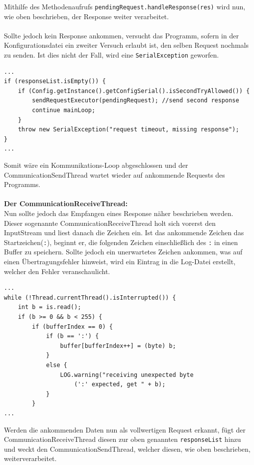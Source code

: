 Mithilfe des Methodenaufrufs \lstinline[style=java]{pendingRequest.handleResponse(res)} wird nun, wie oben beschrieben, der Response weiter verarbeitet.\\\\
Sollte jedoch kein Response ankommen, versucht das Programm, sofern in der Konfigurationsdatei ein zweiter Versuch erlaubt ist, den selben Request nochmals zu senden.
Ist dies nicht der Fall, wird eine \lstinline[style=java]{SerialException} geworfen.
\begin{lstlisting}[style=java,caption=Teilabschnitt CommunicationSendThread,label=commThreadSend]
...
if (responseList.isEmpty()) {
    if (Config.getInstance().getConfigSerial().isSecondTryAllowed()) {
        sendRequestExecutor(pendingRequest); //send second response
        continue mainLoop;
    }
    throw new SerialException("request timeout, missing response");
}
...
\end{lstlisting}
Somit wäre ein Kommunikations-Loop abgeschlossen und der CommunicationSendThread wartet wieder auf ankommende Requests des Programms.\\\\
\textbf{Der CommunicationReceiveThread:}\\
Nun sollte jedoch das Empfangen eines Response näher beschrieben werden.
Dieser sogenannte CommunicationReceiveThread holt sich vorerst den InputStream und liest danach die Zeichen ein.
Ist das ankommende Zeichen das Startzeichen(\lstinline[style=java]{:}), beginnt er, die folgenden Zeichen einschließlich des \lstinline[style=java]{:} in einen Buffer zu speichern.
Sollte jedoch ein unerwartetes Zeichen ankommen, was auf einen Übertragungsfehler hinweist, wird ein Eintrag in die Log-Datei erstellt, welcher den Fehler veranschaulicht.
\begin{lstlisting}[style=java,caption=Teilabschnitt CommunicationReceiveThread,label=commThreadSend]
...
while (!Thread.currentThread().isInterrupted()) {
    int b = is.read();
    if (b >= 0 && b < 255) {
        if (bufferIndex == 0) {
            if (b == ':') {
                buffer[bufferIndex++] = (byte) b;
            }
            else {
                LOG.warning("receiving unexpected byte
                    (':' expected, get " + b);
            }
        }
...
\end{lstlisting}
Werden die ankommenden Daten nun als vollwertigen Request erkannt, fügt der CommunicationReceiveThread diesen zur oben genannten \lstinline[style=java]{responseList} hinzu und weckt den CommunicationSendThread, welcher diesen, wie oben beschrieben, weiterverarbeitet.
